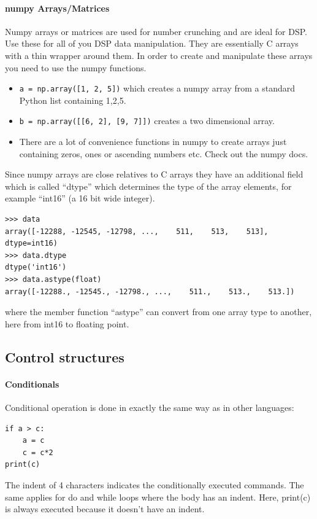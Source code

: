 \documentclass[12pt,a4paper]{article}
\begin{document}
\paragraph{numpy Arrays/Matrices}
Numpy arrays or matrices are used for number crunching and are ideal for
DSP. Use these for all of you DSP data manipulation.
They are essentially C arrays with a thin wrapper around
them. In order to create and manipulate these arrays you need to use the numpy functions.

\begin{itemize}
\item\texttt{a = np.array([1, 2, 5])} which creates a numpy
  array from a standard Python list containing 1,2,5.
\item\texttt{b = np.array([[6, 2], [9, 7]])} creates a two dimensional
  array.
\item There are a lot of convenience functions in numpy to create
  arrays just containing zeros, ones or ascending numbers etc. Check out
   the numpy docs.
\end{itemize}

Since numpy arrays are close relatives to C arrays they have an additional
field which is called ``dtype'' which determines the type of the
array elements, for example ``int16'' (a 16 bit wide integer).
\begin{verbatim}
>>> data
array([-12288, -12545, -12798, ...,    511,    513,    513], dtype=int16)
>>> data.dtype
dtype('int16')
>>> data.astype(float)
array([-12288., -12545., -12798., ...,    511.,    513.,    513.])
\end{verbatim}
where the member function ``astype'' can convert from one array type to another, here
from int16 to floating point.


\subsection{Control structures}

\paragraph{Conditionals}
Conditional operation is done in exactly the same way as in other languages:
\begin{verbatim}
if a > c:
    a = c
    c = c*2
print(c)
\end{verbatim}
The indent of 4 characters indicates the conditionally executed commands. The same
applies for do and while loops where the body has an indent. Here, print(c)
is always executed because it doesn't have an indent.
\end{document}
